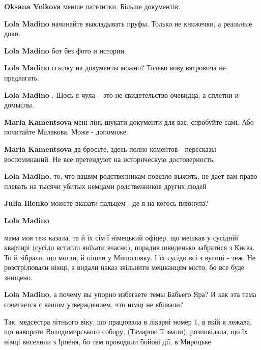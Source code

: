 \begin{itemize}
\begin{itemize}
\begin{itemize}
\textbf{Oksana Volkova} менше патетитки. Більше документів.

\textbf{Lola Madino} начинайте выкладывать пруфы. Только не книжечки, а реальные доки.

\textbf{Lola Madino} бот без фото и истории.

\textbf{Lola Madino} ссылку на документы можно? Только вову вятровича не предлагать.
\end{itemize} %

\textbf{Lola Madino} . Щось я чула – это не свидетельство очевидца, а сплетни и домыслы.

\begin{itemize} %
\textbf{Maria Kamentsova} мені лінь шукати документи для вас, спробуйте самі.
Або почитайте Малакова. Може - допоможе.

\textbf{Maria Kamentsova} да бросьте, здесь полно коментов - пересказы воспоминаний. Не все претендуют на историческую достоверность.
\end{itemize} %

\textbf{Lola Madino}, то, что вашим родственникам повезло выжить, не даёт вам право плевать на тысячи убитых немцами родственников других людей

\textbf{Julia Ilienko} можете вказати пальцем - де я на когось плюнула?

\textbf{Lola Madino} 

мама моя теж казала, та й їх сім'ї німецький офіцер, що мешкав у сусідній
квартирі (сусіди встигли виїхати вчасно), порадив швиденько забратися з Києва.
То й зібрали, що могли, й пішли у Мишоловку. І їх сусіди всі з вулиці - теж. Не
розстрілювали німці, а видали наказ звільнити мешканцям місто, бо все буде
знищено.


\textbf{Lola Madino}, а почему вы упорно избегаете темы Бабьего Яра? И как эта тема сочетается с вашим утверждением, что нiмцi не вбивали?


Так, медсестра літнього віку, що працювала в лікарні номер 1, в якій я лежала,
що навпроти Володимирського собору, (Тамарою її звали), розповідала, що їх німці
виселили з Ірпеня, бо там проводили бойові дії, в Мироцьке

\end{itemize} %


\end{itemize}
